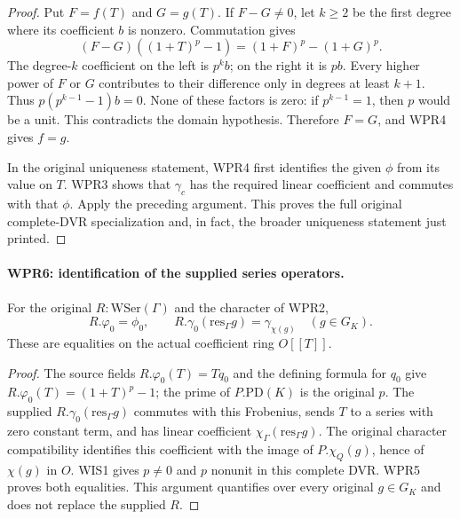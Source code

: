 \documentclass[11pt,a4paper]{article}
\numberwithin{equation}{section}
\theoremstyle{remark}\newtheorem{remark}[theorem]{Remark}
\begin{document}
\begin{proof}
Put $F=f(T)$ and $G=g(T)$. If $F-G\neq0$, let $k\geq2$ be
the first degree where its coefficient $b$ is nonzero.
Commutation gives
\[
 (F-G)((1+T)^p-1)=(1+F)^p-(1+G)^p.
\]
The degree-$k$ coefficient on the left is $p^k b$; on the right
it is $p b$. Every higher power of $F$ or $G$ contributes to
their difference only in degrees at least $k+1$. Thus
$p(p^{k-1}-1)b=0$. None of these factors is zero: if
$p^{k-1}=1$, then $p$ would be a unit. This contradicts the
domain hypothesis. Therefore $F=G$, and WPR4 gives $f=g$.

In the original uniqueness statement, WPR4 first identifies the
given $\phi$ from its value on $T$. WPR3 shows that $\gamma_c$
has the required linear coefficient and commutes with that $\phi$.
Apply the preceding argument. This proves the full original
complete-DVR specialization and, in fact, the broader uniqueness
statement just printed.
\end{proof}

\paragraph{WPR6: identification of the supplied series operators.}
\label{claim:WPR6}
For the original $R:\mathrm{WSer}(\Gamma)$ and the character
of WPR2,
\[
 R.\varphi_0=\phi_0,
 \qquad R.\gamma_0(\mathrm{res}_\Gamma g)=\gamma_{\chi(g)}
                         \quad(g\in G_K).
 \tag{WPR.8}
\]
These are equalities on the actual coefficient ring $O[[T]]$.

\begin{proof}
The source fields $R.\varphi_0(T)=Tq_0$ and the defining
formula for $q_0$ give $R.\varphi_0(T)=(1+T)^p-1$;
the prime of $P.\mathrm{PD}(K)$ is the original $p$.
The supplied $R.\gamma_0(\mathrm{res}_\Gamma g)$ commutes with
this Frobenius, sends $T$ to a series with zero constant term,
and has linear coefficient $\chi_\Gamma(\mathrm{res}_\Gamma g)$.
The original character compatibility identifies this coefficient
with the image of $P.\chi_Q(g)$, hence of $\chi(g)$ in $O$.
WIS1 gives $p\neq0$ and $p$ nonunit in this complete DVR.
WPR5 proves both equalities. This argument quantifies over every
original $g\in G_K$ and does not replace the supplied $R$.
\end{proof}

\end{document}
